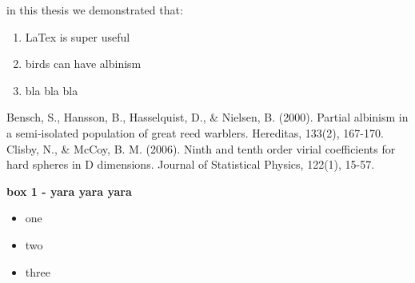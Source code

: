 \documentclass[12pt]{article}
\begin{document}
in this thesis we demonstrated that:

\begin{enumerate}
    \item LaTex is super useful
    \item birds can have albinism
    \item bla bla bla
\end{enumerate}

\begin{thebibliography}{999}
Bensch, S., Hansson, B., Hasselquist, D., \& Nielsen, B. (2000). Partial albinism in a semi‐isolated population of great reed warblers. Hereditas, 133(2), 167-170.
Clisby, N., \& McCoy, B. M. (2006). Ninth and tenth order virial coefficients for hard spheres in D dimensions. Journal of Statistical Physics, 122(1), 15-57.
\end{thebibliography}

\newpage

\hline
\bigskip
\textbf{box 1 - yara yara yara}
\bigskip
\hline
\begin{itemize}
    \item one
    \item two
    \item three
\end{itemize}
\hline
\end{document}
